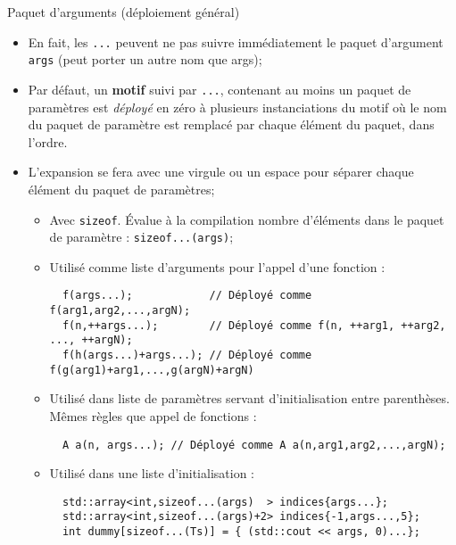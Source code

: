 \documentclass[compress,10pt,aspectratio=169]{beamer}
\begin{document}
  \begin{frame}[fragile]{Paquet d'arguments (déploiement général)}
  \scriptsize 
  \begin{itemize}
  \item En fait, les \texttt{...} peuvent ne pas suivre immédiatement le paquet
  d'argument \texttt{args} (peut porter un autre nom que args);
  \item Par défaut, un \textbf{motif} suivi par \texttt{...}, contenant au moins un 
        paquet de paramètres est \textsl{déployé} en zéro à plusieurs instanciations 
        du motif où le nom du paquet de paramètre est remplacé par chaque élément 
        du paquet, dans l'ordre. 
  \item L'expansion se fera avec une virgule ou un espace pour séparer chaque élément 
        du paquet de paramètres; 
  \begin{itemize}
  \scriptsize 
  \item Avec \texttt{sizeof}. \'Evalue à la compilation nombre d'éléments dans 
        le paquet de paramètre : \texttt{sizeof...(args)};
  \item Utilisé comme liste d'arguments pour l'appel d'une fonction :
  \begin{verbatim}
  f(args...);            // Déployé comme f(arg1,arg2,...,argN);
  f(n,++args...);        // Déployé comme f(n, ++arg1, ++arg2, ..., ++argN);
  f(h(args...)+args...); // Déployé comme f(g(arg1)+arg1,...,g(argN)+argN)
  \end{verbatim}
  \item Utilisé dans liste de paramètres servant d'initialisation entre parenthèses. 
  Mêmes règles que appel de fonctions :
  \begin{verbatim}
  A a(n, args...); // Déployé comme A a(n,arg1,arg2,...,argN);
  \end{verbatim}
  \item Utilisé dans une liste d'initialisation :
  \begin{verbatim}
  std::array<int,sizeof...(args)  > indices{args...};
  std::array<int,sizeof...(args)+2> indices{-1,args...,5};
  int dummy[sizeof...(Ts)] = { (std::cout << args, 0)...};
  \end{verbatim}
  \end{itemize}
  \end{itemize}
  \end{frame}
  
\end{document}

